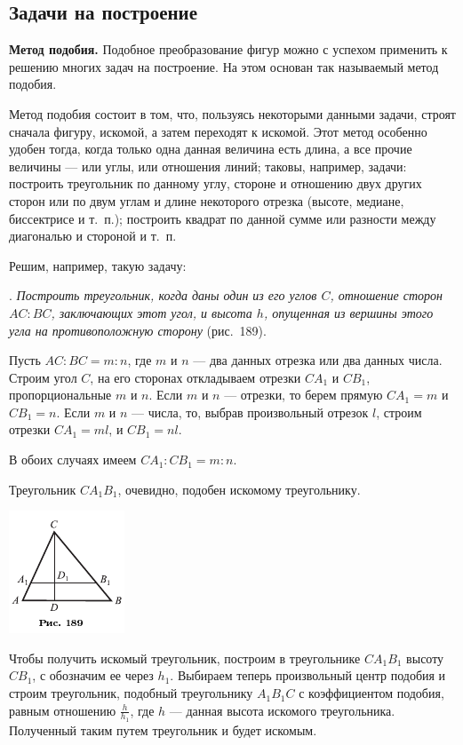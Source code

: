 \documentclass[oneside]{book}
\begin{document}
\subsection*{Задачи на построение}

\textbf{Метод подобия.}
Подобное преобразование фигур можно с успехом применить к решению многих задач на построение.
На этом основан так называемый метод подобия.

Метод подобия состоит в том, что, пользуясь некоторыми данными задачи, строят сначала фигуру,  искомой, а затем переходят к искомой.
Этот метод особенно удобен тогда, когда только одна данная величина есть длина, а все прочие величины — или углы, или отношения линий;
таковы, например, задачи:
построить треугольник по данному углу, стороне и отношению двух других сторон или по двум углам и длине некоторого отрезка (высоте, медиане, биссектрисе и т.~п.);
построить квадрат по данной сумме или разности между диагональю и стороной и т.~п.

Решим, например, такую задачу:

.
\emph{Построить треугольник, когда даны один из его углов $C$, отношение сторон $AC:BC$, заключающих этот угол, и высота $h$, опущенная из вершины этого угла на противоположную сторону} (рис.~189).

Пусть $AC:BC=m:n$, где $m$ и $n$ — два данных отрезка или два данных числа.
Строим угол $C$, на его сторонах откладываем отрезки $CA_1$ и $CB_1$, пропорциональные $m$ и $n$.
Если $m$ и $n$ — отрезки, то берем прямую $CA_1=m$ и $CB_1=n$.
Если $m$ и $n$ — числа, то, выбрав произвольный отрезок $l$, строим отрезки $CA_1=m l$, и $CB_1=nl$.

В обоих случаях имеем $CA_1:CB_1 = m:n$.

Треугольник $CA_1B_1$, очевидно, подобен искомому треугольнику.

\includegraphics{pics/ris-189}

Чтобы получить искомый треугольник, построим в треугольнике $CA_1B_1$ высоту $CB_1$, с обозначим ее через $h_1$.
Выбираем теперь произвольный центр подобия и строим треугольник, подобный треугольнику $A_1B_1C$ с коэффициентом подобия, равным отношению $\tfrac{h}{h_1}$,
где $h$ — данная высота искомого треугольника.
Полученный таким путем треугольник и будет искомым.
\end{document}

